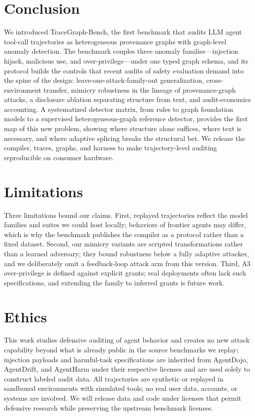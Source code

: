 \section{Conclusion}
\label{sec:conclusion}

We introduced TraceGraph-Bench, the first benchmark that audits LLM agent tool-call trajectories as heterogeneous provenance graphs with graph-level anomaly detection. The benchmark couples three anomaly families---injection hijack, malicious use, and over-privilege---under one typed graph schema, and its protocol builds the controls that recent audits of safety evaluation demand into the spine of the design: leave-one-attack-family-out generalization, cross-environment transfer, mimicry robustness in the lineage of provenance-graph attacks, a disclosure ablation separating structure from text, and audit-economics accounting. A systematized detector matrix, from rules to graph foundation models to a supervised heterogeneous-graph reference detector, provides the first map of this new problem, showing where structure alone suffices, where text is necessary, and where adaptive splicing breaks the structural bet. We release the compiler, traces, graphs, and harness to make trajectory-level auditing reproducible on consumer hardware.

\section*{Limitations}
Three limitations bound our claims. First, replayed trajectories reflect the model families and suites we could host locally; behaviors of frontier agents may differ, which is why the benchmark publishes the compiler as a protocol rather than a fixed dataset. Second, our mimicry variants are scripted transformations rather than a learned adversary; they bound robustness below a fully adaptive attacker, and we deliberately omit a feedback-loop attack arm from this version. Third, A3 over-privilege is defined against explicit grants; real deployments often lack such specifications, and extending the family to inferred grants is future work.

\section*{Ethics}
This work studies defensive auditing of agent behavior and creates no new attack capability beyond what is already public in the source benchmarks we replay; injection payloads and harmful-task specifications are inherited from AgentDojo, AgentDrift, and AgentHarm under their respective licenses and are used solely to construct labeled audit data. All trajectories are synthetic or replayed in sandboxed environments with simulated tools; no real user data, accounts, or systems are involved. We will release data and code under licenses that permit defensive research while preserving the upstream benchmark licenses.
